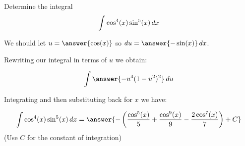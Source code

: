 \documentclass{ximera}
\author{Jason Miller}
\begin{document}
\begin{exercise}
Determine the integral
\[
\int \cos^{4}(x) \sin^{5}(x) \mathop{}\!d x
\]

We should let $u=\answer{\cos(x)}$ so $\d u= \answer{ -\sin(x)} \d x$. 

Rewriting our integral in terms of $u$ we obtain: 

\[
\int \answer{ -u^{4} (1-u^{2})^{2} }\d u
\]

Integrating and then substituting back for $x$ we have:

\[
\int \cos^{4}(x) \sin^{5}(x) \d x=\answer{- \left( \frac{ \cos^{5}(x)}{5} + \frac{ \cos^{9}(x)}{9} -\frac{2 \cos^{7}(x)}{7} \right)+C }
\]
(Use $C$ for the constant of integration)
\end{exercise}
\end{document}
